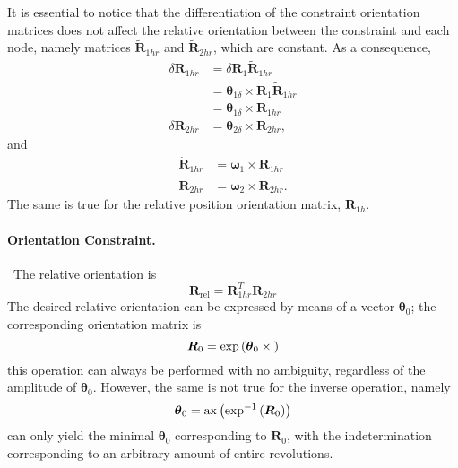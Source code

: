 \documentclass[10pt,dvips,fleqn]{report}
\newcommand{\T}[1]{\boldsymbol{#1}}
\begin{document}
It is essential to notice that the differentiation of the constraint
orientation matrices does not affect the relative orientation between
the constraint and each node, namely matrices $\tilde{\T{R}}_{1hr}$
and $\tilde{\T{R}}_{2hr}$, which are constant.
As a consequence,
\begin{align}
	\delta\T{R}_{1hr}
		&= \delta\T{R}_1 \tilde{\T{R}}_{1hr} \nonumber \\
		&= \T{\theta}_{1\delta} \times \T{R}_1 \tilde{\T{R}}_{1hr} \nonumber \\
		&= \T{\theta}_{1\delta}\times \T{R}_{1hr} \\
	\delta\T{R}_{2hr} &= \T{\theta}_{2\delta}\times \T{R}_{2hr} ,
\end{align}
and
\begin{align}
	\dot{\T{R}}_{1hr} &= \T{\omega}_1 \times \T{R}_{1hr} \\
	\dot{\T{R}}_{2hr} &= \T{\omega}_2 \times \T{R}_{2hr} .
\end{align}
The same is true for the relative position orientation matrix,
$\T{R}_{1h}$.


\paragraph{Orientation Constraint.} \
The relative orientation is
\begin{equation}
	\T{R}_{\mathrm{rel}} = \T{R}_{1hr}^T \T{R}_{2hr}
\end{equation}
The desired relative orientation can be expressed by means of a vector 
$\T{\theta}_0$; the corresponding orientation matrix is
\begin{equation}
	\T{R}_0 = \exp\plbr{\T{\theta}_0\times{}}
\end{equation}
this operation can always be performed with no ambiguity,
regardless of the amplitude of $\T{\theta}_0$.
However, the same is not true for the inverse operation, namely
\begin{equation}
	\T{\theta}_0 = \mathrm{ax}\plbr{\exp^{-1}\plbr{\T{R}_0}}
\end{equation}
can only yield the minimal $\T{\theta}_0$ corresponding to $\T{R}_0$,
with the indetermination corresponding to an arbitrary amount 
of entire revolutions.
\end{document}
